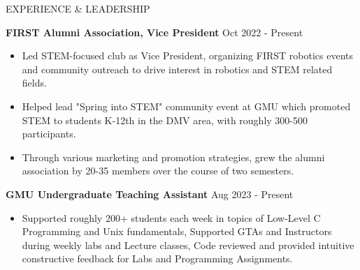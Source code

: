 \documentclass{resume} %
\begin{document}
\begin{rSection}{EXPERIENCE \& LEADERSHIP}

\textbf{FIRST Alumni Association, Vice President} \hfill Oct 2022 - Present
 \begin{itemize}
    \itemsep -3pt {} 
     \item Led STEM-focused club as Vice President, organizing FIRST robotics events and community outreach to drive interest in robotics and STEM related fields.
     \item Helped lead "Spring into STEM" community event at GMU which promoted STEM to students K-12th in the DMV area, with roughly 300-500 participants.
    \item Through various marketing and promotion strategies, grew the alumni association by 20-35 members over the course of two semesters.
 \end{itemize}

\textbf{GMU Undergraduate Teaching Assistant} \hfill Aug 2023 - Present
 \begin{itemize}
    \itemsep -3pt {}
     \item Supported roughly 200+ students each week in topics of Low-Level C Programming and Unix fundamentals, Supported GTAs and Instructors during weekly labs and Lecture classes, Code reviewed and provided intuitive constructive feedback for Labs and Programming Assignments.
 \end{itemize}

\end{rSection} 

\end{document}
